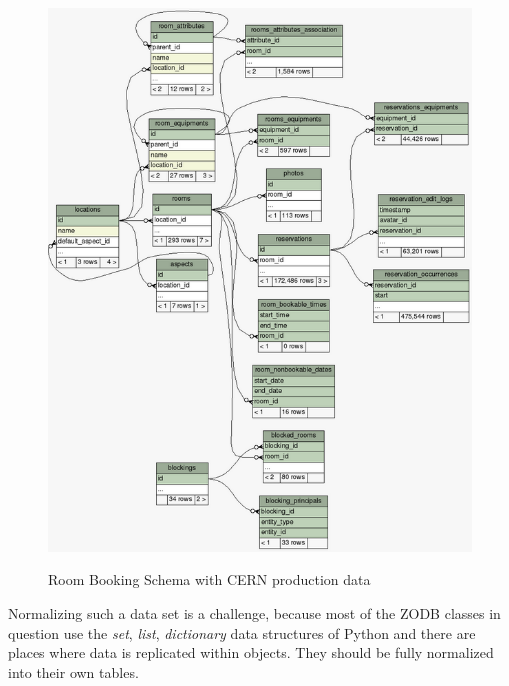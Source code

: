 \begin{figure}[H]
  \caption{Room Booking Schema with CERN production data}
  \centering
    \includegraphics[scale=0.63]{6/figures/schema.png}
  \label{schema}
\end{figure}

Normalizing such a data set is a challenge, because most of the ZODB classes in question use the \textit{set}, \textit{list}, \textit{dictionary} data structures of Python and there are places where data is replicated within objects. They should be fully normalized into their own tables.

